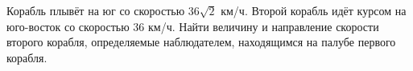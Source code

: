Корабль плывёт на юг со скоростью $36\sqrt{2}$ км/ч. Второй корабль идёт
курсом на юго-восток со скоростью $36$ км/ч. Найти величину и направление
скорости второго корабля, определяемые наблюдателем, находящимся на палубе
первого корабля.
